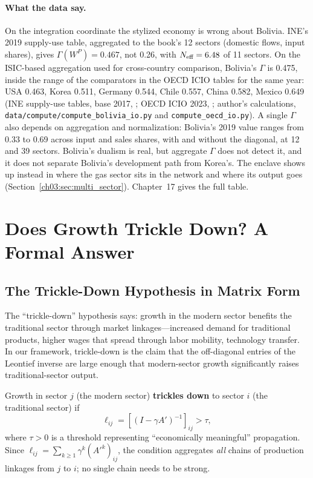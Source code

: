 \documentclass[../structural_economics_book.tex]{subfiles}
\begin{document}
\paragraph{What the data say.} On the integration coordinate the stylized economy is wrong about Bolivia. INE's 2019 supply-use table, aggregated to the book's 12 sectors (domestic flows, input shares), gives $\Gamma(W^P) = 0.467$, not 0.26, with $N_{\text{eff}} = 6.48$ of 11 sectors. On the ISIC-based aggregation used for cross-country comparison, Bolivia's $\Gamma$ is 0.475, inside the range of the comparators in the OECD ICIO tables for the same year: USA 0.463, Korea 0.511, Germany 0.544, Chile 0.557, China 0.582, Mexico 0.649 (INE supply-use tables, base 2017, \citealp{ine2026sut}; OECD ICIO 2023, \citealp{oecd2023icio}; author's calculations, \texttt{data/compute/compute\_bolivia\_io.py} and \texttt{compute\_oecd\_io.py}). A single $\Gamma$ also depends on aggregation and normalization: Bolivia's 2019 value ranges from 0.33 to 0.69 across input and sales shares, with and without the diagonal, at 12 and 39 sectors. Bolivia's dualism is real, but aggregate $\Gamma$ does not detect it, and it does not separate Bolivia's development path from Korea's. The enclave shows up instead in where the gas sector sits in the network and where its output goes (Section~\ref{ch03:sec:multi_sector}). Chapter~17 gives the full table.


\section{Does Growth Trickle Down? A Formal Answer}
\label{ch03:sec:trickle}

\subsection{The Trickle-Down Hypothesis in Matrix Form}

The ``trickle-down'' hypothesis says: growth in the modern sector benefits the traditional sector through market linkages---increased demand for traditional products, higher wages that spread through labor mobility, technology transfer. In our framework, trickle-down is the claim that the off-diagonal entries of the Leontief inverse are large enough that modern-sector growth significantly raises traditional-sector output.

\begin{definition}\label{ch03:prop:trickle}
Growth in sector $j$ (the modern sector) \textbf{trickles down} to sector $i$ (the traditional sector) if
\begin{equation}\label{ch03:eq:trickle}
\ell_{ij} = [(I - \gamma A')^{-1}]_{ij} > \tau,
\end{equation}
where $\tau > 0$ is a threshold representing ``economically meaningful'' propagation. Since $\ell_{ij} = \sum_{k \ge 1}\gamma^k (A'^k)_{ij}$, the condition aggregates \textit{all} chains of production linkages from $j$ to $i$; no single chain needs to be strong.
\end{definition}
\end{document}
